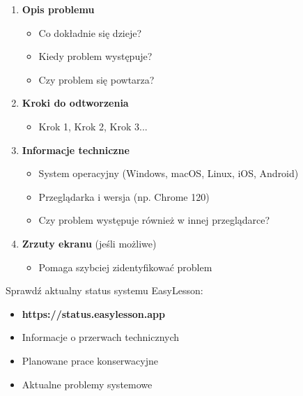 \documentclass[12pt,a4paper]{article}
\begin{document}
\begin{enumerate}
    \item \textbf{Opis problemu}
    \begin{itemize}
        \item Co dokładnie się dzieje?
        \item Kiedy problem występuje?
        \item Czy problem się powtarza?
    \end{itemize}
    
    \item \textbf{Kroki do odtworzenia}
    \begin{itemize}
        \item Krok 1, Krok 2, Krok 3...
    \end{itemize}
    
    \item \textbf{Informacje techniczne}
    \begin{itemize}
        \item System operacyjny (Windows, macOS, Linux, iOS, Android)
        \item Przeglądarka i wersja (np. Chrome 120)
        \item Czy problem występuje również w innej przeglądarce?
    \end{itemize}
    
    \item \textbf{Zrzuty ekranu} (jeśli możliwe)
    \begin{itemize}
        \item Pomaga szybciej zidentyfikować problem
    \end{itemize}
\end{enumerate}


\begin{tcolorbox}[colback=green!5!white,colframe=green!75!black,title=\faInfoCircle\ Status systemu]
Sprawdź aktualny status systemu EasyLesson:
\begin{itemize}
    \item \textbf{https://status.easylesson.app}
    \item Informacje o przerwach technicznych
    \item Planowane prace konserwacyjne
    \item Aktualne problemy systemowe
\end{itemize}
\end{tcolorbox}
\end{document}
